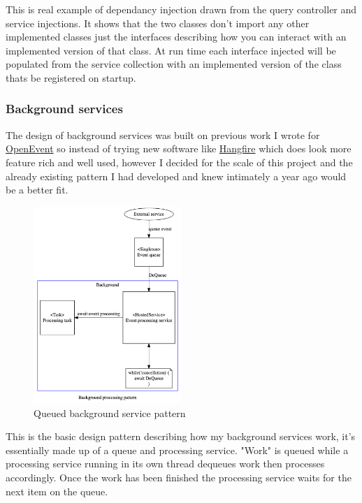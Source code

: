 \documentclass[12pt]{article}
\begin{document}
This is real example of dependancy injection drawn from the query controller and service injections. It shows that the two classes don't import any other implemented classes just the interfaces describing how you can interact with an implemented version of that class. At run time each interface injected will be populated from the service collection with an implemented version of the class thats be registered on startup.

\subsubsection{Background services}

The design of background services was built on previous work I wrote for \href{https://github.com/mrharrisonbarker/openevent}{OpenEvent} so instead of trying new software like \href{https://www.hangfire.io/}{Hangfire} which does look more feature rich and well used, however I decided for the scale of this project and the already existing pattern I had developed and knew intimately a year ago would be a better fit.

\begin{figure}[H]
\caption{Queued background service pattern}
\centering
\includegraphics[width=0.5\textwidth,height=0.5\textheight,keepaspectratio]{images/patterns/background-processing-pattern}
\end{figure}

This is the basic design pattern describing how my background services work, it's essentially made up of a queue and processing service. "Work" is queued while a processing service running in its own thread dequeues work then processes accordingly. Once the work has been finished the processing service waits for the next item on the queue.
\end{document}
